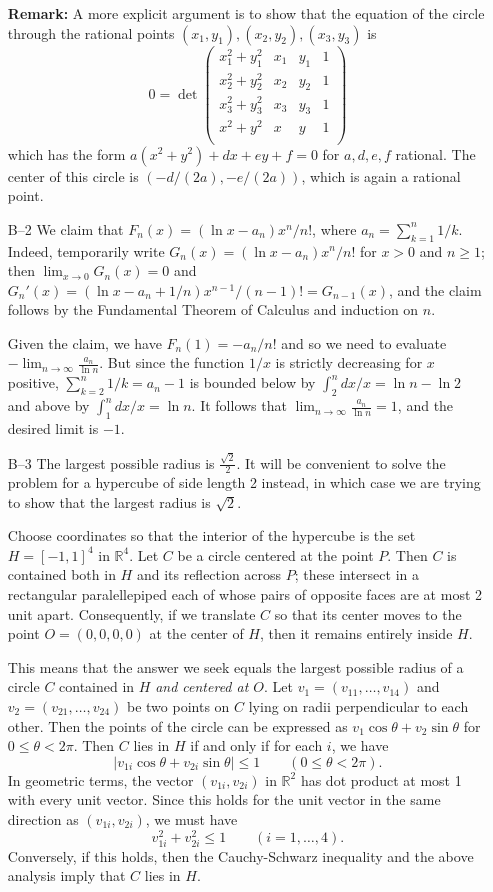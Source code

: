 \documentclass[amssymb,twocolumn,pra,10pt,aps]{revtex4-1}
\newcommand{\RR}{\mathbb{R}}
\begin{document}
\begin{itemize}
\textbf{Remark:} A more explicit argument is to show that the equation of
the circle through the rational points $(x_1, y_1), (x_2, y_2), (x_3, y_3)$ is
\[
0 = \det \begin{pmatrix}
x_1^2 + y_1^2 & x_1 & y_1 & 1 \\
x_2^2 + y_2^2 & x_2 & y_2 & 1 \\
x_3^2 + y_3^2 & x_3 & y_3 & 1 \\
x^2 + y^2 & x & y & 1 \\
\end{pmatrix}
\]
which has the form $a(x^2+y^2) + dx + ey + f = 0$ for $a,d,e,f$ rational.
The center of this circle is $(-d/(2a), -e/(2a))$, which is again a rational
point.

\item[B--2]
We claim that $F_n(x) = (\ln x-a_n)x^n/n!$, where $a_n = \sum_{k=1}^n 1/k$. Indeed, temporarily write $G_n(x) = (\ln x-a_n)x^n/n!$ for $x>0$ and $n\geq 1$; then $\lim_{x\to 0} G_n(x) = 0$ and $G_n'(x) = (\ln x-a_n+1/n) x^{n-1}/(n-1)! = G_{n-1}(x)$, and the claim follows by the Fundamental Theorem of Calculus and induction on $n$.

Given the claim, we have $F_n(1) = -a_n/n!$ and so we need to evaluate $-\lim_{n\to\infty} \frac{a_n}{\ln n}$. But since the function $1/x$ is strictly decreasing for $x$ positive, $\sum_{k=2}^n 1/k = a_n-1$ is bounded below by $\int_2^n dx/x = \ln n-\ln 2$ and above by $\int_1^n dx/x=\ln n$. It follows that $\lim_{n\to\infty} \frac{a_n}{\ln n} = 1$, and the desired limit is $-1$.

\item[B--3]
The largest possible radius is $\frac{\sqrt{2}}{2}$.
It will be convenient to solve
the problem for a hypercube of side length 2 instead, in which case
we are trying to show that the largest radius is $\sqrt{2}$.

Choose coordinates so that the interior of the hypercube
is the set $H = [-1,1]^4$ in $\RR^4$. Let $C$ be a circle
centered at the point $P$. Then $C$ is contained both in $H$
and its reflection across $P$; these intersect in a rectangular
paralellepiped each of whose pairs of opposite faces are at most
2 unit apart. Consequently, if we translate $C$ so that its center
moves to the point $O = (0,0,0,0)$ at the center of $H$,
then it remains entirely inside $H$.

This means that the answer we seek equals the largest possible radius
of a circle $C$ contained in $H$ \emph{and centered at $O$}.
Let $v_1 = (v_{11}, \dots, v_{14})$ and $v_2 = (v_{21},\dots,v_{24})$
be two points on $C$ lying on radii perpendicular to each other.
Then the points of the circle can be expressed as
$v_1 \cos \theta + v_2 \sin \theta$ for $0 \leq \theta < 2\pi$.
Then $C$ lies in $H$ if and only if for each $i$, we have
\[
|v_{1i} \cos \theta + v_{2i} \sin \theta|
\leq 1 \qquad (0 \leq \theta < 2\pi).
\]
In geometric terms, the vector $(v_{1i}, v_{2i})$ in $\RR^2$
has dot product at most 1 with every unit vector. Since this holds
for the unit vector in the same direction as
$(v_{1i}, v_{2i})$, we must have
\[
v_{1i}^2 + v_{2i}^2 \leq 1 \qquad (i=1,\dots,4).
\]
Conversely, if this holds, then the Cauchy-Schwarz inequality
and the above analysis imply that $C$ lies in $H$.


\end{itemize}
\end{document}
